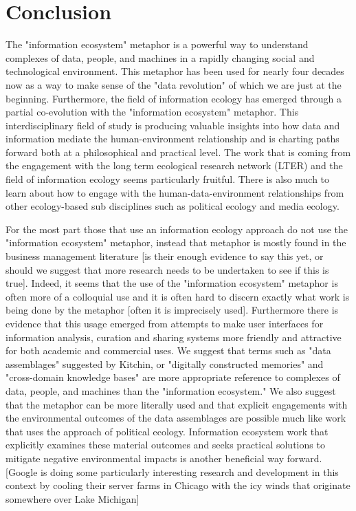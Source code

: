 \section{Conclusion}

The "information ecosystem" metaphor is a powerful way to understand complexes of data, people, and machines in a rapidly changing social and technological environment. This metaphor has been used for nearly four decades now as a way to make sense of the "data revolution" of which we are just at the beginning. Furthermore, the field of information ecology has emerged through a partial co-evolution with the "information ecosystem" metaphor. This interdisciplinary field of study is producing valuable insights into how data and information mediate the human-environment relationship and is charting paths forward both at a philosophical and practical level. The work that is coming from the engagement with the long term ecological research network (LTER) and the field of information ecology seems particularly fruitful. There is also much to learn about how to engage with the human-data-environment relationships from other ecology-based sub disciplines such as political ecology and media ecology. 

For the most part those that use an information ecology approach do not use the "information ecosystem" metaphor, instead that metaphor is mostly found in the business management literature [is their enough evidence to say this yet, or should we suggest that more research needs to be undertaken to see if this is true]. Indeed, it seems that the use of the "information ecosystem" metaphor is often more of a colloquial use and it is often hard to discern exactly what work is being done by the metaphor [often it is imprecisely used]. Furthermore there is evidence that this usage emerged from attempts to make user interfaces for information analysis, curation and sharing systems more friendly and attractive for both academic and commercial uses. We suggest that terms such as "data assemblages" suggested by Kitchin, or "digitally constructed memories" and "cross-domain knowledge bases" \citep{baker_2007} are more appropriate reference to complexes of data, people, and machines than the "information ecosystem." We also suggest that the metaphor can be more literally used and that explicit engagements with the environmental outcomes of the data assemblages are possible much like work that uses the approach of political ecology. Information ecosystem work that explicitly examines these material outcomes and seeks practical solutions to mitigate negative environmental impacts is another beneficial way forward. [Google is doing some particularly interesting research and development in this context by cooling their server farms in Chicago with the icy winds that originate somewhere over Lake Michigan]

